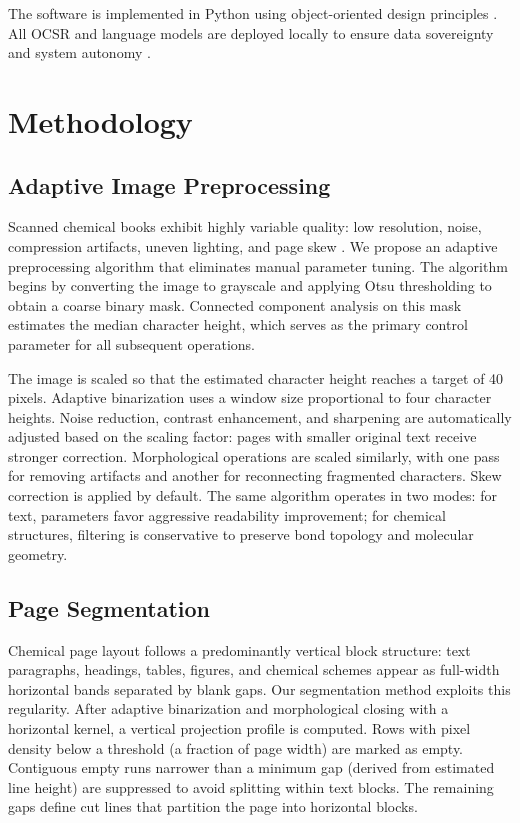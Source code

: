 \documentclass[conference]{IEEEtran}
\begin{document}
The software is implemented in Python using object-oriented design principles \cite{refGoFEn}. All OCSR and language models are deployed locally to ensure data sovereignty and system autonomy \cite{refTrofimovEn}.

\section{Methodology}

\subsection{Adaptive Image Preprocessing}

Scanned chemical books exhibit highly variable quality: low resolution, noise, compression artifacts, uneven lighting, and page skew \cite{refAkhilEn}. We propose an adaptive preprocessing algorithm that eliminates manual parameter tuning. The algorithm begins by converting the image to grayscale and applying Otsu thresholding to obtain a coarse binary mask. Connected component analysis on this mask estimates the median character height, which serves as the primary control parameter for all subsequent operations.

The image is scaled so that the estimated character height reaches a target of 40 pixels. Adaptive binarization uses a window size proportional to four character heights. Noise reduction, contrast enhancement, and sharpening are automatically adjusted based on the scaling factor: pages with smaller original text receive stronger correction. Morphological operations are scaled similarly, with one pass for removing artifacts and another for reconnecting fragmented characters. Skew correction is applied by default. The same algorithm operates in two modes: for text, parameters favor aggressive readability improvement; for chemical structures, filtering is conservative to preserve bond topology and molecular geometry.

\subsection{Page Segmentation}

Chemical page layout follows a predominantly vertical block structure: text paragraphs, headings, tables, figures, and chemical schemes appear as full-width horizontal bands separated by blank gaps. Our segmentation method exploits this regularity. After adaptive binarization and morphological closing with a horizontal kernel, a vertical projection profile is computed. Rows with pixel density below a threshold (a fraction of page width) are marked as empty. Contiguous empty runs narrower than a minimum gap (derived from estimated line height) are suppressed to avoid splitting within text blocks. The remaining gaps define cut lines that partition the page into horizontal blocks.
\end{document}
